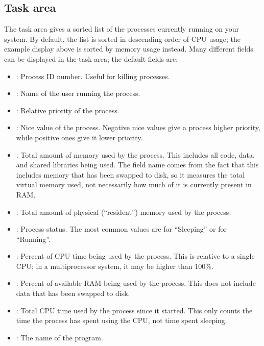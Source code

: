 \documentclass[letterpaper,10pt,english]{sphinxmanual}
\begin{document}
\subsection{Task area}
\label{top:task-area}
The task area gives a sorted list of the processes currently running
on your system.  By default, the list is sorted in descending order of
CPU usage; the example display above is sorted by memory usage
instead.  Many different fields can be displayed in the task area; the
default fields are:
\begin{itemize}
\item {} 
: Process ID number.  Useful for killing processes.

\item {} 
: Name of the user running the process.

\item {} 
: Relative priority of the process.

\item {} 
: Nice value of the process.  Negative nice values give a
process higher priority, while positive ones give it lower
priority.

\item {} 
: Total amount of memory used by the process.  This
includes all code, data, and shared libraries being used.  The
field name comes from the fact that this includes memory that has
been swapped to disk, so it measures the total virtual memory used,
not necessarily how much of it is currently present in RAM.

\item {} 
: Total amount of physical (``resident'') memory used by the
process.

\item {} 
: Process status.  The most common values are  for
``Sleeping'' or  for ``Running''.

\item {} 
: Percent of CPU time being used by the process.  This is
relative to a single CPU; in a multiprocessor system, it may be
higher than 100\%.

\item {} 
: Percent of available RAM being used by the process.  This
does not include data that has been swapped to disk.

\item {} 
: Total CPU time used by the process since it started.
This only counts the time the process has spent using the CPU, not
time spent sleeping.

\item {} 
: The name of the program.

\end{itemize}
\end{document}
